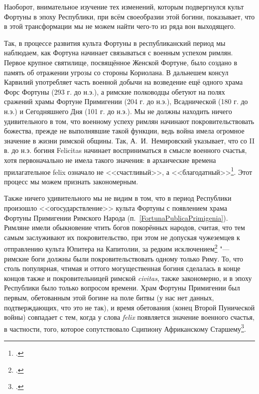 Наоборот, внимательное изучение тех изменений, которым подвергнулся культ Фортуны в эпоху Республики, при всём своеобразии этой богини, показывает, что в этой трансформации мы не можем найти чего-то из ряда вон выходящего.


Так, в процессе развития культа Фортуны в республиканский период мы наблюдаем, как Фортуна начинает связываться с военным успехом римлян. Первое крупное святилище, посвящённое Женской Фортуне, было создано в память об отражении угрозы со стороны Кориолана. В дальнешем консул Карвилий употребляет часть военной добычи на возведение ещё одного храма Форс Фортуны (293 г. до н.э.), а римские полководцы обетуют на полях сражений храмы Фортуне Примигении (204 г. до н.э.), Всаднической (180 г. до н.э.) и Сегодняшнего Дня (101 г. до н.э.). Мы не должны находить ничего удивительного в том, что военному успеху римлян начинают покровительствовать божества, прежде не выполнявшие такой функции, ведь война имела огромное значение в жизни римской общины. Так, А.~И.~Немировский указывает, что со II в. до н.э. богиня Felicitas начинает восприниматься в смысле военного счастья, хотя первоначально не имела такого значения: в архаические времена прилагательное felix означало не <<счастливый>>, а <<благодатный>>\footcite[С. 153--154]{Nemirovsky1964}. Этот процесс мы можем признать закономерным.


Также ничего удивительного мы не видим в том, что в период Республики произошло <<огосударствление>> культа Фортуны с появлением храма Фортуны Примигении Римского Народа (п.~\ref{FortunaPublicaPrimigenia}). Римляне имели обыкновение чтить богов покорённых народов, считая, что тем самым заслуживают их покровительство, при этом не допуская чужеземцев к отправлению культа Юпитера на Капитолии, за редким исключением\footcite[С. 315--316]{Boissier1914} "--- римские боги должны были покровительствовать одному только Риму. То, что столь популярная, чтимая и оттого могущественная богиня сделалась в конце концов также и покровительницей римской \textit{civitas}, также закономерно, и в эпоху Республики было только вопросом времени. Храм Фортуны Примигении был первым, обетованным этой богине на поле битвы (у нас нет данных, подтверждающих, что это не так), и время обетования (конец Второй Пунической войны) совпадает с тем, когда у слова \textit{felix} появляется значение военного счастья, в частности, того, которое сопутствовало Сципиону Африканскому Старшему\footcite[С. 153]{Nemirovsky1964}.

